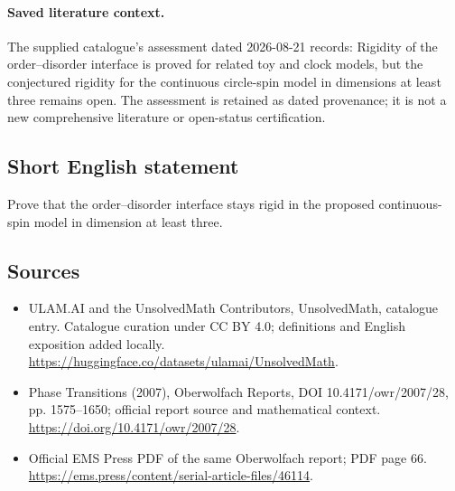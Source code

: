 \documentclass[11pt]{article}
\begin{document}
\paragraph{Saved literature context.} The supplied catalogue's assessment dated 2026-08-21 records: Rigidity of the order--disorder interface is proved for related toy and clock models, but the conjectured rigidity for the continuous circle-spin model in dimensions at least three remains open. The assessment is retained as dated provenance; it is not a new comprehensive literature or open-status certification.
\subsection{Short English statement}
Prove that the order--disorder interface stays rigid in the proposed continuous-spin model in dimension at least three.
\subsection{Sources}
\begin{itemize}
\item[\hypertarget{source:statement:1}{S1}] ULAM.AI and the UnsolvedMath Contributors, UnsolvedMath, catalogue entry. Catalogue curation under CC BY 4.0; definitions and English exposition added locally.
\url{https://huggingface.co/datasets/ulamai/UnsolvedMath}.
\item[\hypertarget{source:statement:2}{S2}] Phase Transitions (2007), Oberwolfach Reports, DOI 10.4171/owr/2007/28, pp. 1575--1650; official report source and mathematical context.
\url{https://doi.org/10.4171/owr/2007/28}.
\item[\hypertarget{source:statement:3}{S3}] Official EMS Press PDF of the same Oberwolfach report; PDF page 66.
\url{https://ems.press/content/serial-article-files/46114}.
\end{itemize}
\label{end:statement}
\end{document}

